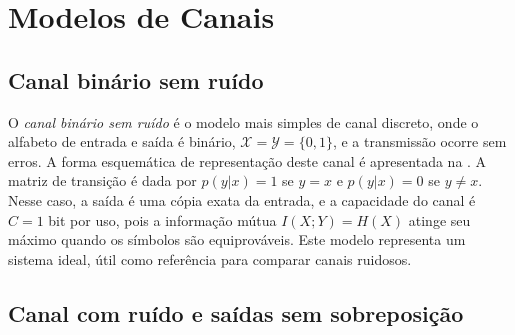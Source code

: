 \section{Modelos de Canais}

\subsection{Canal binário sem ruído}

\begin{marginfigure}%
  \centering
  \caption{Representação esquemática de um canal binário sem ruído.}\label{fig:bsc}
\end{marginfigure}

O \emph{canal binário sem ruído} é o modelo mais simples de canal discreto, onde o
alfabeto de entrada e saída é binário, $\mathcal{X} = \mathcal{Y} = \{0, 1\}$,
e a transmissão ocorre sem erros. A forma esquemática de representação deste canal
é apresentada na . A matriz de transição é dada por $p(y|x) = 1$
se $y = x$ e $p(y|x) = 0$ se $y \neq x$. Nesse caso, a saída é uma cópia exata da entrada, e
a capacidade do canal é $C = 1$ bit por uso, pois a informação mútua $I(X;Y) = H(X)$ 
atinge seu máximo quando os símbolos são equiprováveis. Este modelo
representa um sistema ideal, útil como referência para comparar canais ruidosos.



\subsection{Canal com ruído e saídas sem sobreposição}

